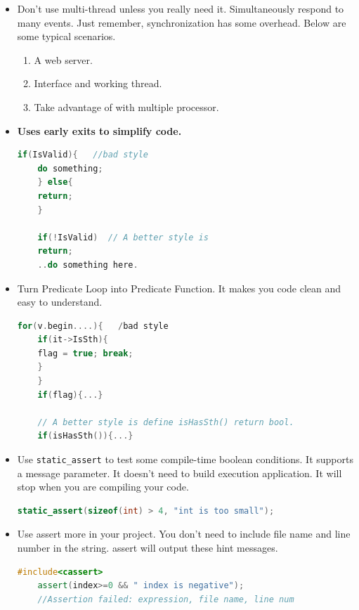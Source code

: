 \documentclass[a4paper,12pt,twoside]{book}
\begin{document}
\begin{itemize}
	\item Don't use multi-thread unless you really need it. Simultaneously respond to many events. Just remember, synchronization has some overhead. Below are some typical scenarios.
	\begin{enumerate}
		\item A web server.
		\item Interface and working thread.
		\item Take advantage of with multiple processor.
	\end{enumerate}
	
	\item \textbf{Uses early exits to simplify code.}
	
	\begin{lstlisting}[frame=single, language=c++]
	if(IsValid){   //bad style
	do something;
	} else{
	return;
	}
	
	if(!IsValid)  // A better style is
	return;
	..do something here.
	\end{lstlisting}
	
	\item Turn Predicate Loop into Predicate Function. It makes you code clean and easy to understand.
	
	\begin{lstlisting}[frame=single, language=c++]
	for(v.begin....){   /bad style
	if(it->IsSth){
	flag = true; break;
	}
	}
	if(flag){...}
	
	// A better style is define isHasSth() return bool.
	if(isHasSth()){...}
	\end{lstlisting}
	
	\item Use \texttt{static\_assert} to test some compile-time boolean conditions. It supports a message parameter. It doesn't need to build execution application. It will stop when you are compiling your code. 
	\begin{lstlisting}[frame=single, language=c++]
	static_assert(sizeof(int) > 4, "int is too small");
	\end{lstlisting}
	
	\item Use assert more in your project. You don't need to include file name and line number in the string. assert will output these hint messages.
	\begin{lstlisting}[frame=single, language=c++]
	#include<cassert>
	assert(index>=0 && " index is negative");
	//Assertion failed: expression, file name, line num
	\end{lstlisting}
	

\end{itemize}
\end{document}
